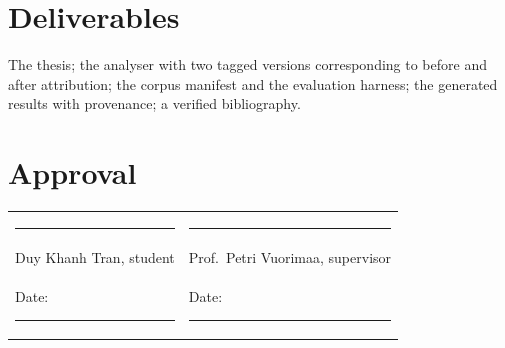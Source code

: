 \documentclass[11pt,a4paper]{article}
\begin{document}
\section{Deliverables}

The thesis; the analyser with two tagged versions corresponding to before and after
attribution; the corpus manifest and the evaluation harness; the generated results
with provenance; a verified bibliography.

\vspace{2em}
\section*{Approval}

\begin{tabular}{@{}p{7cm}p{7cm}}
\\[1.5em]
\rule{6.5cm}{0.4pt} & \rule{6.5cm}{0.4pt} \\
Duy Khanh Tran, student & Prof.\ Petri Vuorimaa, supervisor \\[0.4em]
Date: \rule{3cm}{0.4pt} & Date: \rule{3cm}{0.4pt} \\
\end{tabular}
\end{document}
